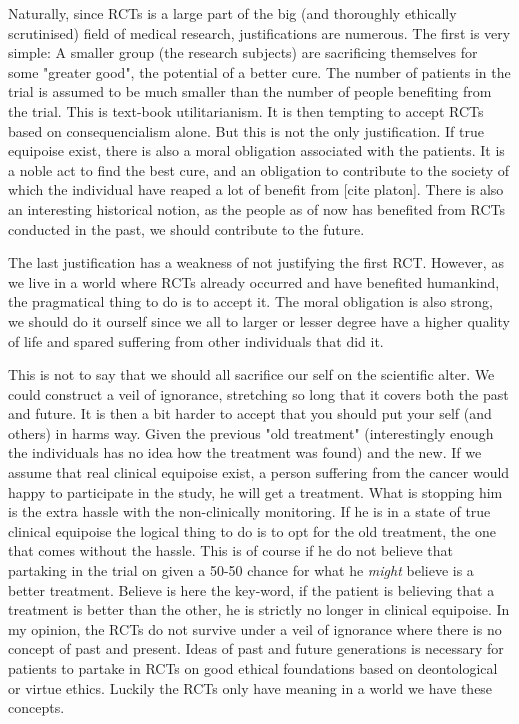 \documentclass[12p]{article}
\begin{document}
Naturally, since RCTs is a large part of the big (and thoroughly ethically scrutinised) field of medical research, justifications are numerous.
The first is very simple:
A smaller group (the research subjects) are sacrificing themselves for some "greater good", the potential of a better cure.
The number of patients in the trial is assumed to be much smaller than the number of people benefiting from the trial.
This is text-book utilitarianism.%
It is then tempting to accept RCTs based on consequencialism alone.
But this is not the only justification.
If true equipoise exist, there is also a moral obligation associated with the patients.
It is a noble act to find the best cure, and an obligation to contribute to the society of which the individual have reaped a lot of benefit from [cite platon].
There is also an interesting historical notion, as the people as of now has benefited from RCTs conducted in the past, we should contribute to the future.

The last justification has a weakness of not justifying the first RCT.
However, as we live in a world where RCTs already occurred and have benefited humankind, the pragmatical thing to do is to accept it.
The moral obligation is also strong, we should do it ourself since we all to larger or lesser degree have a higher quality of life and spared suffering from other individuals that did it.

This is not to say that we should all sacrifice our self on the scientific alter.
We could construct a veil of ignorance, stretching so long that it covers both the past and future.
It is then a bit harder to accept that you should put your self (and others) in harms way.
Given the previous "old treatment" (interestingly enough the individuals has no idea how the treatment was found) and the new.
If we assume that real clinical equipoise exist, a person suffering from the cancer would happy to participate in the study, he will get a treatment.
What is stopping him is the extra hassle with the non-clinically monitoring.
If he is in a state of true clinical equipoise the logical thing to do is to opt for the old treatment, the one that comes without the hassle.
This is of course if he do not believe that partaking in the trial on given a 50-50 chance for what he \emph{might} believe is a better treatment.
Believe is here the key-word, if the patient is believing that a treatment is better than the other, he is strictly no longer in clinical equipoise.
In my opinion, the RCTs do not survive under a veil of ignorance where there is no concept of past and present.
Ideas of past and future generations is necessary for patients to partake in RCTs on good ethical foundations based on deontological or virtue ethics.
Luckily the RCTs only have meaning in a world we have these concepts.
\end{document}
